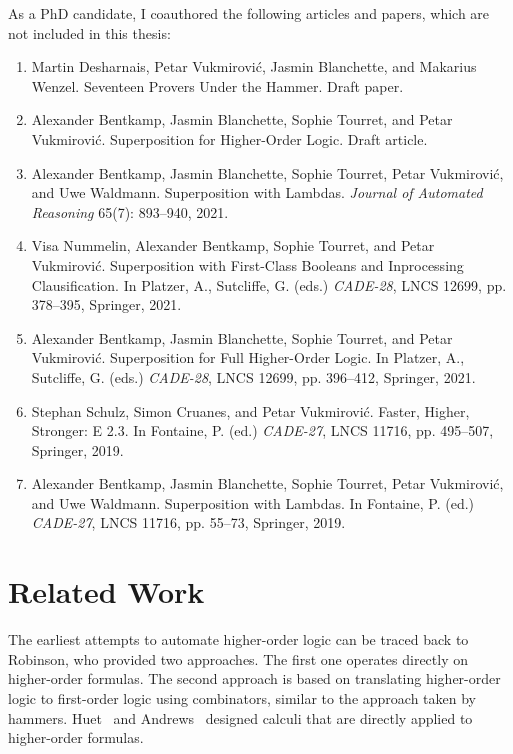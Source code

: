 As a PhD candidate, I coauthored the following articles and papers, which are not included in this thesis:

\begin{enumerate}[resume]
  \item Martin Desharnais, Petar Vukmirović, Jasmin Blanchette, and Makarius Wenzel. Seventeen Provers Under the Hammer.
  Draft paper.
  \item Alexander Bentkamp, Jasmin Blanchette, Sophie Tourret, and Petar Vukmirović. Superposition for Higher-Order Logic.
  Draft article.
  \item Alexander Bentkamp, Jasmin Blanchette, Sophie Tourret, Petar Vukmirović, and Uwe Waldmann.  Superposition with Lambdas.
  \emph{Journal of Automated Reasoning} 65(7): 893--940, 2021. 
  \item Visa Nummelin, Alexander Bentkamp, Sophie Tourret, and Petar Vukmirović. Superposition with First-Class Booleans and Inprocessing Clausification.
  In Platzer, A., Sutcliffe, G. (eds.) \emph{CADE-28}, LNCS 12699, pp. 378--395, Springer, 2021.
  \item Alexander Bentkamp, Jasmin Blanchette, Sophie Tourret, and Petar Vukmirović. Superposition for Full Higher-Order Logic.
  In Platzer, A., Sutcliffe, G. (eds.) \emph{CADE-28}, LNCS 12699, pp. 396--412, Springer, 2021.
  \item Stephan Schulz, Simon Cruanes, and Petar Vukmirović. Faster, Higher, Stronger: E 2.3.
  In Fontaine, P. (ed.) \emph{CADE-27},  LNCS 11716, pp. 495--507, Springer, 2019.
  \item Alexander Bentkamp, Jasmin Blanchette, Sophie Tourret, Petar Vukmirović, and Uwe Waldmann.  Superposition with Lambdas.
  In Fontaine, P. (ed.) \emph{CADE-27}, LNCS 11716, pp. 55--73, Springer, 2019. 
\end{enumerate}

\section{Related Work}

The earliest attempts to automate higher-order logic can be traced back to
Robinson, who provided two approaches. The first one \cite{ar-69-hol} operates
directly on higher-order formulas. The second approach \cite{ar-70-hol} is based
on translating higher-order logic to first-order logic using combinators,
similar to the approach taken by hammers. Huet~\cite{gh-73-hol} and
Andrews~\cite{pa-71-type-theory} designed calculi that are directly applied to
higher-order formulas.

